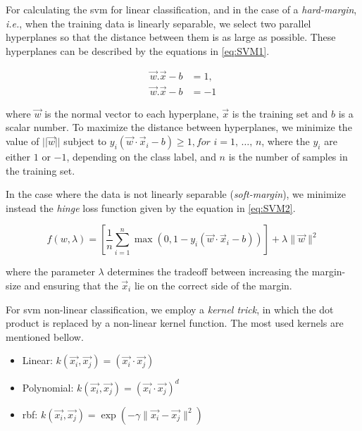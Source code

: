 For calculating the \ac{svm} for linear classification, and in the case of a \textit{hard-margin}, \textit{i.e.}, when the training data is linearly separable, we select two parallel hyperplanes so that the distance between them is as large as possible.
These hyperplanes can be described by the equations in \ref{eq:SVM1}.

\begin{equation}
\label{eq:SVM1}
\begin{split}
\vec{w}.\vec{x}-b&=1, \\
\vec{w}.\vec{x}-b&=-1
\end{split}
\end{equation}

where $\vec{w}$ is the normal vector to each hyperplane, $\vec{x}$ is the training set and $b$ is a scalar number.
To maximize the distance between hyperplanes, we minimize the value of $||\vec{w}||$ subject to ${\displaystyle y_{i}({\vec {w}}\cdot {\vec {x}}_{i}-b)\geq 1,} for$ ${\displaystyle i=1,\,\ldots ,\,n} $, where the $y_{i}$ are either $1$ or $-1$, depending on the class label, and $n$ is the number of samples in the training set.

In the case where the data is not linearly separable (\textit{soft-margin}), we minimize instead the \textit{hinge} loss function given by the equation in \ref{eq:SVM2}.

\begin{equation}
\label{eq:SVM2}
f(w,\lambda)={\displaystyle \left[{\frac {1}{n}}\sum _{i=1}^{n}\max \left(0,1-y_{i}({\vec {w}}\cdot {\vec {x}}_{i}-b)\right)\right]+\lambda \lVert {\vec {w}}\rVert ^{2}}
\end{equation}

where the parameter $\lambda$ determines the tradeoff between increasing the margin-size and ensuring that the ${\vec {x}}_{i}$ lie on the correct side of the margin.

For \ac{svm} non-linear classification, we employ a \textit{kernel trick}, in which the dot product is replaced by a non-linear kernel function. The most used kernels are mentioned bellow.

\begin{itemize}
    
    \item Linear: ${\displaystyle k({\vec {x_{i}}},{\vec {x_{j}}})=({\vec {x_{i}}}\cdot {\vec {x_{j}}})}$

    \item Polynomial: ${\displaystyle k({\vec {x_{i}}},{\vec {x_{j}}})=({\vec {x_{i}}}\cdot {\vec {x_{j}}})^{d}}$

    \item \ac{rbf}: ${\displaystyle k({\vec {x_{i}}},{\vec {x_{j}}})=\exp(-\gamma \|{\vec {x_{i}}}-{\vec {x_{j}}}\|^{2})}$
\end{itemize}



